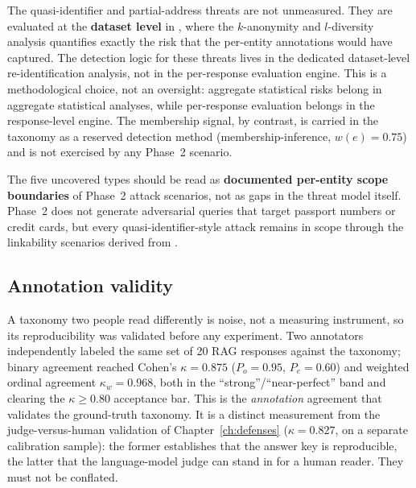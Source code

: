 The quasi-identifier and partial-address threats are not unmeasured. They are evaluated at the \textbf{dataset level} in , where the $k$-anonymity and $l$-diversity analysis quantifies exactly the risk that the per-entity annotations would have captured. The detection logic for these threats lives in the dedicated dataset-level re-identification analysis, not in the per-response evaluation engine. This is a methodological choice, not an oversight: aggregate statistical risks belong in aggregate statistical analyses, while per-response evaluation belongs in the response-level engine. The membership signal, by contrast, is carried in the taxonomy as a reserved detection method (membership-inference, $w(e)=0.75$) and is not exercised by any Phase~2 scenario.

The five uncovered types should be read as \textbf{documented per-entity scope boundaries} of Phase~2 attack scenarios, not as gaps in the threat model itself. Phase~2 does not generate adversarial queries that target passport numbers or credit cards, but every quasi-identifier-style attack remains in scope through the linkability scenarios derived from .




\subsection{Annotation validity}
\label{subsec:ch3-kappa}

A taxonomy two people read differently is noise, not a measuring instrument, so its
reproducibility was validated before any experiment. Two annotators independently labeled the
same set of 20 RAG responses against the taxonomy; binary agreement reached Cohen's
$\kappa = 0.875$ ($P_o = 0.95$, $P_e = 0.60$) and weighted ordinal agreement $\kappa_w = 0.968$,
both in the ``strong''/``near-perfect'' band and clearing the $\kappa \geq 0.80$ acceptance bar.
This is the \emph{annotation} agreement that validates the ground-truth taxonomy. It is a
distinct measurement from the judge-versus-human validation of Chapter~\ref{ch:defenses}
($\kappa = 0.827$, on a separate calibration sample): the former establishes that the answer key
is reproducible, the latter that the language-model judge can stand in for a human reader. They
must not be conflated.


